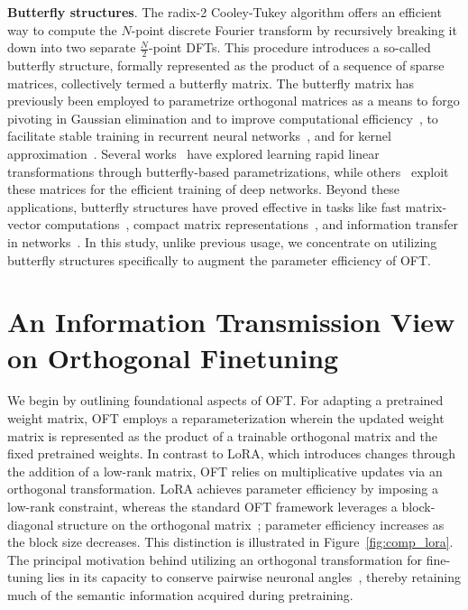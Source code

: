 \textbf{Butterfly structures}. The radix-2 Cooley-Tukey algorithm offers an efficient way to compute the $N$-point discrete Fourier transform by recursively breaking it down into two separate $\frac{N}{2}$-point DFTs. This procedure introduces a so-called butterfly structure, formally represented as the product of a sequence of sparse matrices, collectively termed a butterfly matrix. The butterfly matrix has previously been employed to parametrize orthogonal matrices as a means to forgo pivoting in Gaussian elimination and to improve computational efficiency~\cite{parker1995random}, to facilitate stable training in recurrent neural networks~\cite{jing2017tunable}, and for kernel approximation~\cite{munkhoeva2018quadrature}. Several works~\cite{dao2019learning,dao2019kaleidoscope} have explored learning rapid linear transformations through butterfly-based parametrizations, while others~\cite{chen2022pixelated,dao2022monarch} exploit these matrices for the efficient training of deep networks. Beyond these applications, butterfly structures have proved effective in tasks like fast matrix-vector computations~\cite{michielssen1996multilevel,o2010algorithm}, compact matrix representations~\cite{li2015butterfly}, and information transfer in networks~\cite{klasing1994broadcasting,li2003linear,rajasingh2016transmission}. In this study, unlike previous usage, we concentrate on utilizing butterfly structures specifically to augment the parameter efficiency of OFT.

\section{An Information Transmission View on Orthogonal Finetuning}

We begin by outlining foundational aspects of OFT. For adapting a pretrained weight matrix, OFT employs a reparameterization wherein the updated weight matrix is represented as the product of a trainable orthogonal matrix and the fixed pretrained weights. In contrast to LoRA, which introduces changes through the addition of a low-rank matrix, OFT relies on multiplicative updates via an orthogonal transformation. LoRA achieves parameter efficiency by imposing a low-rank constraint, whereas the standard OFT framework leverages a block-diagonal structure on the orthogonal matrix~\cite{qiu2023controlling}; parameter efficiency increases as the block size decreases. This distinction is illustrated in Figure~\ref{fig:comp_lora}. The principal motivation behind utilizing an orthogonal transformation for fine-tuning lies in its capacity to conserve pairwise neuronal angles~\cite{liu2018learning,liu2021orthogonal,qiu2023controlling}, thereby retaining much of the semantic information acquired during pretraining.

